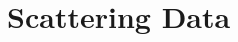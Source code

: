 \label{DOMDataSets}
\section{\oSix\ Scattering Data}

\begin{figure}[h!]
    \centering
    \begin{minipage}[b]{0.45\linewidth}
        
    \end{minipage}
    \hfill
    \begin{minipage}[b]{0.45\linewidth}
        
    \end{minipage}
\end{figure}

%        
%        
%
%        
%        

